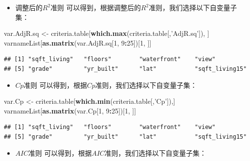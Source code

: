 \documentclass[]{article}
\newenvironment{Shaded}{\begin{snugshade}}{\end{snugshade}}
\newcommand{\KeywordTok}[1]{\textcolor[rgb]{0.13,0.29,0.53}{\textbf{#1}}}
\newcommand{\DecValTok}[1]{\textcolor[rgb]{0.00,0.00,0.81}{#1}}
\newcommand{\StringTok}[1]{\textcolor[rgb]{0.31,0.60,0.02}{#1}}
\newcommand{\OperatorTok}[1]{\textcolor[rgb]{0.81,0.36,0.00}{\textbf{#1}}}
\newcommand{\NormalTok}[1]{#1}
\providecommand{\tightlist}{%
  \setlength{\itemsep}{0pt}\setlength{\parskip}{0pt}}
\begin{document}
\begin{itemize}
\tightlist
\item
  调整后的\(R^2\)准则
  可以得到，根据调整后的\(R^2\)准则，我们选择以下自变量子集：
\end{itemize}

\begin{Shaded}
\begin{Highlighting}[]
\NormalTok{var.AdjR.sq <-}\StringTok{ }\NormalTok{criteria.table[}\KeywordTok{which.max}\NormalTok{(criteria.table[,}\StringTok{'AdjR.sq'}\NormalTok{]), ]}
\NormalTok{varnameList[}\KeywordTok{as.matrix}\NormalTok{(var.AdjR.sq[}\DecValTok{1}\NormalTok{, }\DecValTok{9}\OperatorTok{:}\DecValTok{25}\NormalTok{])[}\DecValTok{1}\NormalTok{, ]]}
\end{Highlighting}
\end{Shaded}

\begin{verbatim}
## [1] "sqft_living"   "floors"        "waterfront"    "view"         
## [5] "grade"         "yr_built"      "lat"           "sqft_living15"
\end{verbatim}

\begin{itemize}
\tightlist
\item
  \(Cp\)准则 可以得到，根据\(Cp\)准则，我们选择以下自变量子集：
\end{itemize}

\begin{Shaded}
\begin{Highlighting}[]
\NormalTok{var.Cp <-}\StringTok{ }\NormalTok{criteria.table[}\KeywordTok{which.min}\NormalTok{(criteria.table[,}\StringTok{'Cp'}\NormalTok{]),]}
\NormalTok{varnameList[}\KeywordTok{as.matrix}\NormalTok{(var.Cp[}\DecValTok{1}\NormalTok{, }\DecValTok{9}\OperatorTok{:}\DecValTok{25}\NormalTok{])[}\DecValTok{1}\NormalTok{, ]]}
\end{Highlighting}
\end{Shaded}

\begin{verbatim}
## [1] "sqft_living"   "floors"        "waterfront"    "view"         
## [5] "grade"         "yr_built"      "lat"           "sqft_living15"
\end{verbatim}

\begin{itemize}
\tightlist
\item
  \(AIC\)准则 可以得到，根据\(AIC\)准则，我们选择以下自变量子集：
\end{itemize}
\end{document}
